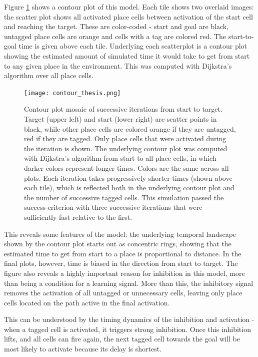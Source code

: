 \documentclass{article}
\begin{document}
    Figure \ref{contour_plot} shows a contour plot of this model. Each tile shows two overlaid images: the scatter plot shows all activated place cells between activation of the start cell and reaching the target. These are color-coded - start and goal are black, untagged place cells are orange and cells with a tag are colored red. The start-to-goal time is given above each tile.
    Underlying each scatterplot is a contour plot showing the estimated amount of simulated time it would take to get from start to any given place in the environment. This was computed with Dijkstra's algorithm over all place cells. 

    \begin{figure}[H]
        \texttt{[image: contour\_thesis.png]}
        \caption{Contour plot mosaic of successive iterations from start to target. Target (upper left) and start (lower right) are scatter points in black, while other place cells are colored orange if they are untagged, red if they are tagged. Only place cells that were activated during the iteration is shown. The underlying contour plot was computed with Dijkstra's algorithm from start to all place cells, in which darker colors represent longer times. Colors are the same across all plots. Each iteration takes progressively shorter times (shown above each tile), which is reflected both in the underlying contour plot and the number of successive tagged cells. This simulation passed the success-criterion with three successive iterations that were sufficiently fast relative to the first.}
        \label{contour_plot}
    \end{figure}

    This reveals some features of the model: the underlying temporal landscape shown by the contour plot starts out as concentric rings, showing that the estimated time to get from start to a place is proportional to distance. In the final plots, however, time is biased in the direction from start to target.
    The figure also reveals a highly important reason for inhibition in this model, more than being a condition for a learning signal. More than this, the inhibitory signal removes the activation of all untagged or unnecessary cells, leaving only place cells located on the path active in the final activation. 

    This can be understood by the timing dynamics of the inhibition and activation - when a tagged cell is activated, it triggers strong inhibition. Once this inhibition lifts, and all cells can fire again, the next tagged cell towards the goal will be most likely to activate because its delay is shortest. 
\end{document}
